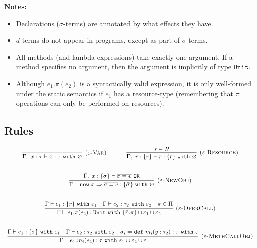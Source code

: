 \documentclass{llncs}
\newcommand{\keywadj}[1]{\mathtt{#1}}
\newcommand{\keyw}[1]{\keywadj{#1}~}
\begin{document}
\noindent \textbf{Notes:}

\begin{itemize}
	\item Declarations ($\sigma$-terms) are annotated by what effects they have.
	\item $d$-terms do not appear in programs, except as part of $\sigma$-terms.
	\item All methods (and lambda expressions) take exactly one argument. If a method specifies no argument, then the argument is implicitly of type $\keywadj{Unit}$.
	\item Although $e_1.\pi(e_2)$ is a syntactically valid expression, it is only well-formed under the static semantics if $e_1$ has a resource-type (remembering that $\pi$ operations can only be performed on resources). 
\end{itemize}

\subsection{Rules}

\fbox{$\Gamma \vdash e : \tau~\keyw{with} \varepsilon$}

\[
\begin{array}{c}
\infer[\textsc{($\varepsilon$-Var)}]
  {\Gamma,~x:\tau \vdash x:\tau~ \keyw{with} \varnothing}
  {} 
~~~~~~~~~~
\infer[\textsc{($\varepsilon$-Resource)}]
  {\Gamma,~r :\{r\} \vdash r:\{ r \} ~ \keyw{with} \varnothing}
  {r \in R} \\[5ex]

\infer[\textsc{($\varepsilon$-NewObj)}]
	{\Gamma \vdash \keywadj{new}~x \Rightarrow \overline{\sigma = e} : \{ \bar \sigma \}~\keyw{with} \varnothing}
	{\Gamma,~x : \{ \bar \sigma \} \vdash \overline{\sigma = e}~\keywadj{OK}} \\[5ex]

\infer[\textsc{($\varepsilon$-OperCall)}]
	{\Gamma \vdash e_1.\pi(e_2) : \keyw{Unit} \keyw{with} \{ \bar r.\pi \} \cup \varepsilon_1 \cup \varepsilon_2}
	{\Gamma \vdash e_1 : \{ \bar r \}~ \keyw{with} \varepsilon_1 & \Gamma \vdash e_2:\tau_2~\keyw{with} \varepsilon_2 & \pi \in \Pi} \\[5ex]
	
\infer[\textsc{($\varepsilon$-MethCallObj)}]
	{\Gamma \vdash e_1.m_i(e_2):\tau~\keyw{with} \varepsilon_1 \cup \varepsilon_2 \cup \varepsilon}
	{\Gamma \vdash e_1 : \{ \bar \sigma \}~\keyw{with} \varepsilon_1 & \Gamma \vdash e_2 : \tau_2~\keyw{with} \varepsilon_2 & \sigma_i = \keyw{def} m_i(y:\tau_2):\tau~\keyw{with} \varepsilon}

\end{array}
\]
\end{document}
